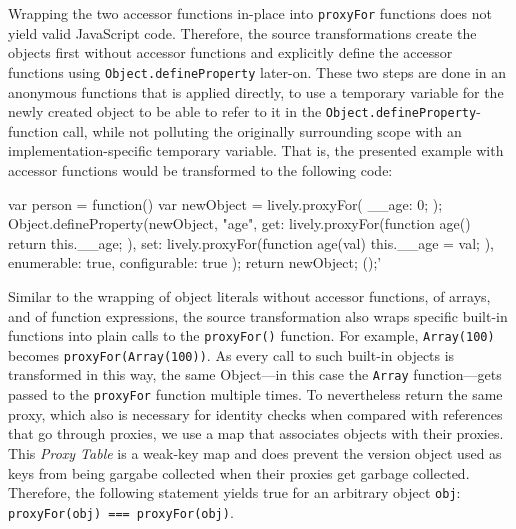 Wrapping the two accessor functions in-place into \lstinline{proxyFor} functions does not yield valid JavaScript code.
Therefore, the source transformations create the objects first without accessor functions and explicitly define the accessor functions using \lstinline{Object.defineProperty} later-on.
These two steps are done in an anonymous functions that is applied directly, to use a temporary variable for the newly created object to be able to refer to it in the \lstinline{Object.defineProperty}-function call, while not polluting the originally surrounding scope with an implementation-specific temporary variable.
That is, the presented example with accessor functions would be transformed to the following code: \\

\iffalse
\begin{verbatim}\fi
\begin{code}{}{}
var person = function() {
    var newObject = lively.proxyFor({
        __age: 0;
    });
    Object.defineProperty(newObject, "age", {
        get: lively.proxyFor(function age() {
            return this.__age;
        }),
        set: lively.proxyFor(function age(val) {
            this.__age = val;
        }),
        enumerable: true,
        configurable: true
    });
    return newObject;
}();'
\end{code}
\iffalse
\end{verbatim}\fi

Similar to the wrapping of object literals without accessor functions, of arrays, and of function expressions, the source transformation also wraps specific built-in functions into plain calls to the \lstinline{proxyFor()} function.
For example, \lstinline{Array(100)} becomes \lstinline{proxyFor(Array(100))}.
As every call to such built-in objects is transformed in this way, the same Object---in this case the \lstinline{Array} function---gets passed to the \lstinline{proxyFor} function multiple times.
To nevertheless return the same proxy, which also is necessary for identity checks when compared with references that go through proxies, we use a map that associates objects with their proxies.
This \emph{Proxy Table} is a weak-key map and does prevent the version object used as keys from being gargabe collected when their proxies get garbage collected.
Therefore, the following statement yields true for an arbitrary object \lstinline{obj}: \lstinline{proxyFor(obj) === proxyFor(obj)}.

